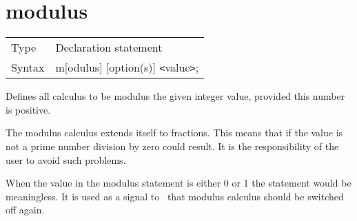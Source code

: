  
\section{modulus}
\label{substamodulus}

\noindent \begin{tabular}{ll}
Type & Declaration statement\\
Syntax & m[odulus] [option(s)] {\tt<}value{\tt>};
\end{tabular} \vspace{4mm}

\noindent Defines all calculus to be modulus the given 
integer value, provided this number is positive.


\noindent The modulus calculus extends itself to 
fractions. This means that if the value is not a prime 
number division by zero could result. It is the responsibility of the user 
to avoid such problems.

\noindent When the value in the modulus statement is either 0 or 1 the 
statement would be meaningless. It is used as a signal to \FORM\ that modulus 
calculus should be switched off again.

